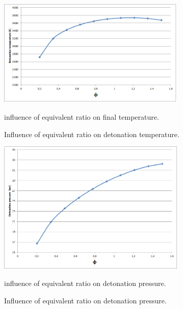 \documentclass[11pt]{article}
\begin{document}
 \begin{figure} [H]
	\begin{center}
    	\includegraphics[width=0.8\textwidth]{ffi_temp}
        \caption{Influence of equivalent ratio on detonation temperature.}
    \end{center}
\normalsize
{influence of equivalent ratio on final temperature.}
\end{figure}

 \begin{figure} [H]
	\begin{center}
    	\includegraphics[width=0.8\textwidth]{ffi_press}
        \caption{Influence of equivalent ratio on detonation pressure.}
    \end{center}
\normalsize
{influence of equivalent ratio on detonation pressure.}
\end{figure}
\end{document}
